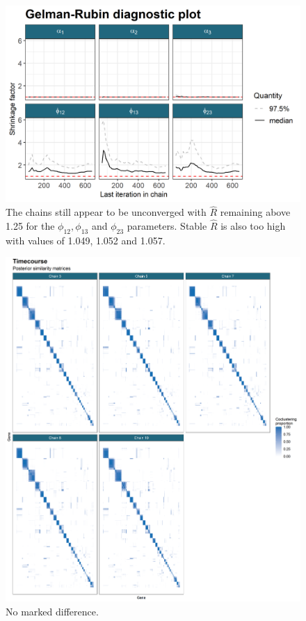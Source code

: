 \documentclass[]{article}
\begin{document}
\begin{figure}
	\centering
	\includegraphics[scale=1.0]{../Images/Yeast/Convergence/gelmanPlot.png}
	\caption{The chains still appear to be unconverged with $\hat{R}$ remaining above 1.25 for the $\phi_{12}, \phi_{13}$ and $\phi_{23}$ parameters. Stable $\hat{R}$ is also too high with values of 1.049, 1.052 and 1.057.}
	\label{fig:gelmanPlot}
\end{figure}

\begin{figure}
	\centering
	\includegraphics[scale=0.5]{../Images/Yeast/TimecoursePSMcomparisonReduced.png}
	\caption{No marked difference.}
	\label{fig:timecoursePSMs}
\end{figure}
\end{document}
